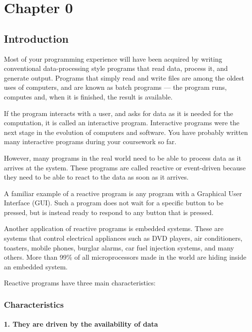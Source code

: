 \documentclass{article}
\begin{document}
\chapter{Chapter 0}

\section{Introduction}

Most of your programming experience will have been acquired by writing conventional data-processing style programs that read data, process it, and generate output. Programs that simply read and write files are among the oldest uses of computers, and are known as batch programs — the program runs, computes and, when it is finished, the result is available.

If the program interacts with a user, and asks for data as it is needed for the computation, it is called an interactive program. Interactive programs were the next stage in the evolution of computers and software. You have probably written many interactive programs during your coursework so far.

However, many programs in the real world need to be able to process data as it arrives at the system. These programs are called reactive or event-driven because they need to be able to react to the data as soon as it arrives.

A familiar example of a reactive program is any program with a Graphical User Interface (GUI). Such a program does not wait for a specific button to be pressed, but is instead ready to respond to any button that is pressed.

Another application of reactive programs is embedded systems. These are systems that control electrical appliances such as DVD players, air conditioners, toasters, mobile phones, burglar alarms, car fuel injection systems, and many others. More than 99\% of all microprocessors made in the world are hiding inside an embedded system.

Reactive programs have three main characteristics:

\subsection{Characteristics}

\subsubsection{1. They are driven by the availability of data} 
\end{document}
